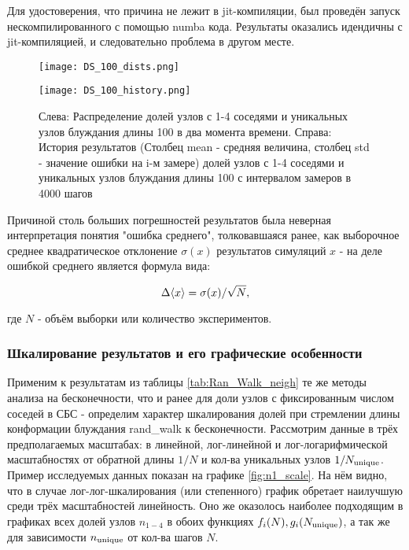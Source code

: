 Для удостоверения, что причина не лежит в jit-компиляции, был проведён запуск нескомпилированного с помощью numba кода. Результаты оказались идендичны с jit-компиляцией, и следовательно проблема в другом месте.

\begin{figure}
	\caption{Слева: Распределение долей узлов с 1-4 соседями и уникальных узлов блуждания длины 100 в два момента времени. Справа: История результатов (Столбец mean - средняя величина, столбец std - значение ошибки на i-м замере) долей узлов с 1-4 соседями и уникальных узлов блуждания длины 100 с интервалом замеров в 4000 шагов}
     \label{fig:DS_100_dists_history}
\begin{minipage}{0.32\textwidth}
     \texttt{[image: DS\_100\_dists.png]}
\end{minipage}
\begin{minipage}{0.67\textwidth}
     \texttt{[image: DS\_100\_history.png]}
\end{minipage}
	
\end{figure}


Причиной столь больших погрешностей результатов была неверная интерпретация понятия "ошибка среднего", толковавшаяся ранее, как выборочное среднее квадратическое отклонение $\sigma(x)$ результатов симуляций $x$ - на деле ошибкой среднего является формула вида:

\[\Delta\langle x \rangle = \sigma(x)/\sqrt{N},\]

где  $N$ - объём выборки или количество экспериментов.


\subsubsection{Шкалирование результатов и его графические особенности}

Применим к результатам из таблицы \ref{tab:Ran_Walk_neigh} те же методы анализа на бесконечности, что и ранее для доли узлов с фиксированным числом соседей в СБС - определим характер шкалирования долей при стремлении длины конформации блуждания rand\_walk к бесконечности.
Рассмотрим данные в трёх предполагаемых масштабах: в линейной, лог-линейной и лог-логарифмической масштабностях от обратной длины $1/N$ и кол-ва уникальных узлов $1/N_{\textup{unique}}$.
Пример исследуемых данных показан на графике \ref{fig:n1_scale}. 
На нём видно, что в случае лог-лог-шкалирования (или степенного) график обретает наилучшую среди трёх масштабностей линейность.
Оно же оказолось наиболее подходящим в графиках всех долей узлов $n_{1-4}$ в обоих функциях $f_i(N), g_i(N_{\textup{unique}})$, а так же для зависимости $n_{\textup{unique}}$ от кол-ва шагов $N$.

